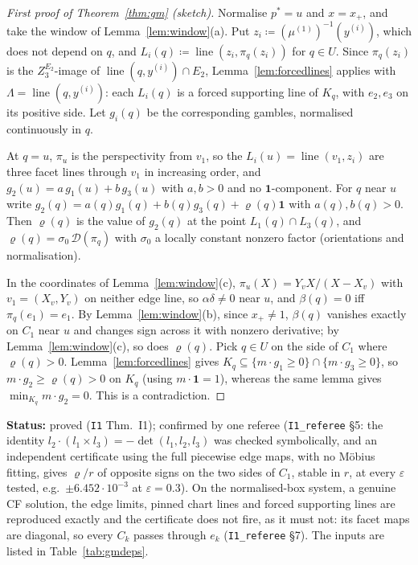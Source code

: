 \documentclass[11pt]{article}
\theoremstyle{definition}
\theoremstyle{remark}
\newcommand{\one}{\mathbf 1}
\newcommand{\lin}{\operatorname{line}}
\newcommand{\src}[1]{\texttt{#1}}
\newcommand{\status}[1]{\par\smallskip\noindent\textbf{Status:} #1\par\smallskip}
\begin{document}
\begin{proof}[First proof of Theorem~\ref{thm:gm} (sketch)]
Normalise $p^*=u$ and $x=x_+$, and take the window of Lemma~\ref{lem:window}(a). Put $z_i\coloneqq(\mu^{(1)})^{-1}(y^{(i)})$, which does not depend on $q$, and $L_i(q)\coloneqq\lin(z_i,\pi_q(z_i))$ for $q\in U$. Since $\pi_q(z_i)$ is the $Z^{E_2}_3$-image of $\lin(q,y^{(i)})\cap E_2$, Lemma~\ref{lem:forcedlines} applies with $\Lambda=\lin(q,y^{(i)})$: each $L_i(q)$ is a forced supporting line of $K_q$, with $e_2,e_3$ on its positive side. Let $g_i(q)$ be the corresponding gambles, normalised continuously in $q$.

At $q=u$, $\pi_u$ is the perspectivity from $v_1$, so the $L_i(u)=\lin(v_1,z_i)$ are three facet lines through $v_1$ in increasing order, and $g_2(u)=a\,g_1(u)+b\,g_3(u)$ with $a,b>0$ and no $\one$-component. For $q$ near $u$ write $g_2(q)=a(q)g_1(q)+b(q)g_3(q)+\varrho(q)\one$ with $a(q),b(q)>0$. Then $\varrho(q)$ is the value of $g_2(q)$ at the point $L_1(q)\cap L_3(q)$, and $\varrho(q)=\sigma_0\,\mathcal D(\pi_q)$ with $\sigma_0$ a locally constant nonzero factor (orientations and normalisation).

In the coordinates of Lemma~\ref{lem:window}(c), $\pi_u(X)=Y_vX/(X-X_v)$ with $v_1=(X_v,Y_v)$ on neither edge line, so $\alpha\delta\ne0$ near $u$, and $\beta(q)=0$ iff $\pi_q(e_1)=e_1$. By Lemma~\ref{lem:window}(b), since $x_+\ne1$, $\beta(q)$ vanishes exactly on $C_1$ near $u$ and changes sign across it with nonzero derivative; by Lemma~\ref{lem:window}(c), so does $\varrho(q)$. Pick $q\in U$ on the side of $C_1$ where $\varrho(q)>0$. Lemma~\ref{lem:forcedlines} gives $K_q\subseteq\{m\cdot g_1\ge0\}\cap\{m\cdot g_3\ge0\}$, so $m\cdot g_2\ge\varrho(q)>0$ on $K_q$ (using $m\cdot\one=1$), whereas the same lemma gives $\min_{K_q}m\cdot g_2=0$. This is a contradiction.
\end{proof}
\status{proved (\src{I1} Thm.~I1); confirmed by one referee (\src{I1\_referee} \S5: the identity $l_2\cdot(l_1\times l_3)=-\det(l_1,l_2,l_3)$ was checked symbolically, and an independent certificate using the full piecewise edge maps, with no M\"obius fitting, gives $\varrho/r$ of opposite signs on the two sides of $C_1$, stable in $r$, at every $\varepsilon$ tested, e.g.\ $\pm6.452\cdot10^{-3}$ at $\varepsilon=0.3$). On the normalised-box system, a genuine CF solution, the edge limits, pinned chart lines and forced supporting lines are reproduced exactly and the certificate does not fire, as it must not: its facet maps are diagonal, so every $C_k$ passes through $e_k$ (\src{I1\_referee} \S7). The inputs are listed in Table~\ref{tab:gmdeps}.}
\end{document}
